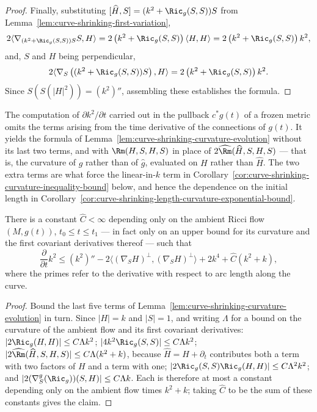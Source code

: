 \begin{proof}
Finally, substituting $[\widehat H,S]=(k^2+\Ric_g(S,S))S$ from
Lemma~\ref{lem:curve-shrinking-first-variation},
$$2\langle\nabla_{(k^2+\Ric_g(S,S))S}S,H\rangle=2\left(k^2+\Ric_g(S,S)\right)\langle H,H\rangle=2\left(k^2+\Ric_g(S,S)\right)k^2,$$
and, $S$ and $H$ being perpendicular,
$$2\langle\nabla_S\left((k^2+\Ric_g(S,S))S\right),H\rangle=2\left(k^2+\Ric_g(S,S)\right)k^2.$$
Since $S(S(|H|^2))=(k^2)''$, assembling these establishes the formula.
\end{proof}

\begin{remark}
\label{rem:curve-shrinking-evolution-erratum}
The computation of $\partial k^2/\partial t$ carried out in the pullback
$c^*g(t)$ of a frozen metric omits the terms arising from the time derivative of
the connections of $g(t)$. It yields the formula of
Lemma~\ref{lem:curve-shrinking-curvature-evolution} without its last two terms,
and with $\Rm(H,S,H,S)$ in place of $2\widehat{\Rm}(\widehat H,S,H,S)$ — that is,
the curvature of $g$ rather than of $\hat g$, evaluated on $H$ rather than
$\widehat H$. The two extra terms are what force the linear-in-$k$ term in
Corollary~\ref{cor:curve-shrinking-curvature-inequality-bound} below, and hence
the dependence on the initial length in
Corollary~\ref{cor:curve-shrinking-length-curvature-exponential-bound}.
\end{remark}

\begin{corollary}
\label{cor:curve-shrinking-curvature-inequality-bound}
\label{*4'}
There is a constant $\widehat C<\infty$ depending only on the ambient Ricci flow
$(M,g(t))$, $t_0\le t\le t_1$ — in fact only on an upper bound for its curvature
and the first covariant derivatives thereof — such that
$$\frac{\partial }{\partial t}k^2\le
(k^2)''-2\langle(\nabla_SH)^\perp,(\nabla_SH)^\perp\rangle+2k^4+\widehat C(k^2+k),$$
where the primes refer to the derivative with respect to arc length along the
curve.
\end{corollary}

\begin{proof}
Bound the last five terms of Lemma~\ref{lem:curve-shrinking-curvature-evolution}
in turn. Since $|H|=k$ and $|S|=1$, and writing $\Lambda$ for a bound on the
curvature of the ambient flow and its first covariant derivatives:
$|2\Ric_g(H,H)|\le C\Lambda k^2$; $|4k^2\Ric_g(S,S)|\le C\Lambda k^2$;
$|2\widehat{\Rm}(\widehat H,S,H,S)|\le C\Lambda(k^2+k)$, because
$\widehat H=H+\partial_t$ contributes both a term with two factors of $H$ and a
term with one; $|2\Ric_g(S,S)\Ric_g(H,H)|\le C\Lambda^2k^2$; and
$|2(\nabla^g_S(\Ric_g))(S,H)|\le C\Lambda k$. Each is therefore at most a
constant depending only on the ambient flow times $k^2+k$; taking $\widehat C$
to be the sum of these constants gives the claim.
\end{proof}

